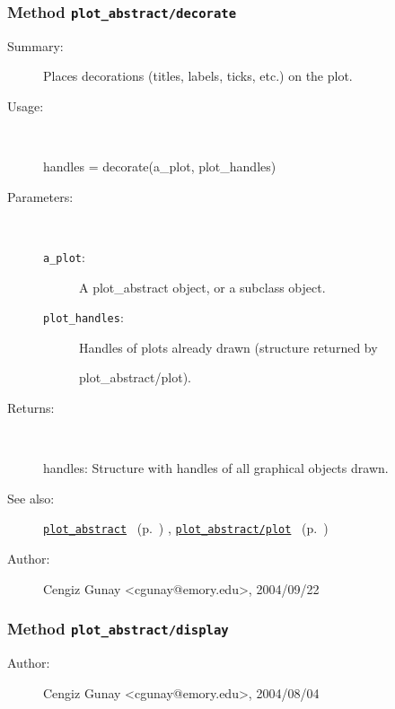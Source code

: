 \subsubsection[Method \texttt{decorate}]{Method \texttt{plot\_abstract/decorate}}%
%
\label{ref_plot_abstract__decorate}%
\hypertarget{ref_plot_abstract__decorate}{}%
\begin{description}
\item[Summary:]Places decorations (titles, labels, ticks, etc.) on the plot.
%
\item[Usage:]~%
\begin{lyxcode}%
handles = decorate(a\_plot, plot\_handles)
%
\end{lyxcode}%
%
%
\item[Parameters:]~
\begin{description}%
\item[\texttt{a\_plot}:]
 A plot\_abstract object, or a subclass object.
\item[\texttt{plot\_handles}:]
 Handles of plots already drawn (structure returned by

plot\_abstract/plot). 
\end{description}%
%
\item[Returns:
]~

   handles: Structure with handles of all graphical objects drawn.
%
%
\item[See also:]%
\hyperlink{ref_plot_abstract}{\texttt{plot\_abstract}}%
\ (p.~\pageref{ref_plot_abstract})%
%
, \hyperlink{ref_plot_abstract__plot}{\texttt{plot\_abstract/plot}}%
\ (p.~\pageref{ref_plot_abstract__plot})%
%
%
\item[Author:]%
Cengiz Gunay <cgunay@emory.edu>, 2004/09/22
%
\end{description}
\methodline%
\subsubsection[Method \texttt{display}]{Method \texttt{plot\_abstract/display}}%
%
\label{ref_plot_abstract__display}%
\hypertarget{ref_plot_abstract__display}{}%
\begin{description}
%
%
%
%
%
%
%
\item[Author:]%
Cengiz Gunay <cgunay@emory.edu>, 2004/08/04
%
\end{description}
\methodline%
